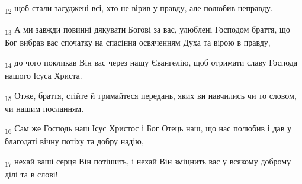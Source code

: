 \begin{tcolorbox}
\textsubscript{12} щоб стали засуджені всі, хто не вірив у правду, але полюбив неправду.
\end{tcolorbox}
\begin{tcolorbox}
\textsubscript{13} А ми завжди повинні дякувати Богові за вас, улюблені Господом браття, що Бог вибрав вас спочатку на спасіння освяченням Духа та вірою в правду,
\end{tcolorbox}
\begin{tcolorbox}
\textsubscript{14} до чого покликав Він вас через нашу Євангелію, щоб отримати славу Господа нашого Ісуса Христа.
\end{tcolorbox}
\begin{tcolorbox}
\textsubscript{15} Отже, браття, стійте й тримайтеся передань, яких ви навчились чи то словом, чи нашим посланням.
\end{tcolorbox}
\begin{tcolorbox}
\textsubscript{16} Сам же Господь наш Ісус Христос і Бог Отець наш, що нас полюбив і дав у благодаті вічну потіху та добру надію,
\end{tcolorbox}
\begin{tcolorbox}
\textsubscript{17} нехай ваші серця Він потішить, і нехай Він зміцнить вас у всякому доброму ділі та в слові!
\end{tcolorbox}
